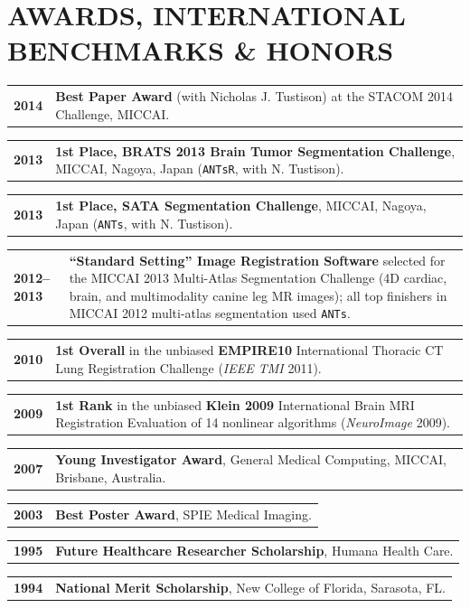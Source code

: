 \documentclass[10pt,letterpaper]{article}
\makeatletter
\newcommand{\cvline}[2]{%
  \noindent\begin{tabularx}{\textwidth}{@{} >{\raggedright\arraybackslash\bfseries\footnotesize\color{accent}}p{1.15in} >{\footnotesize\arraybackslash}X @{}}
    #1 & #2
  \end{tabularx}\par\vspace{2pt}%
}
\makeatother
\begin{document}
\section{AWARDS, INTERNATIONAL BENCHMARKS \& HONORS}
\cvline{2014}{\textbf{Best Paper Award} (with Nicholas J. Tustison) at the STACOM 2014 Challenge, MICCAI.}
\cvline{2013}{\textbf{1st Place, BRATS 2013 Brain Tumor Segmentation Challenge}, MICCAI, Nagoya, Japan (\texttt{ANTsR}, with N. Tustison).}
\cvline{2013}{\textbf{1st Place, SATA Segmentation Challenge}, MICCAI, Nagoya, Japan (\texttt{ANTs}, with N. Tustison).}
\cvline{2012--2013}{\textbf{``Standard Setting'' Image Registration Software} selected for the MICCAI 2013 Multi-Atlas Segmentation Challenge (4D cardiac, brain, and multimodality canine leg MR images); all top finishers in MICCAI 2012 multi-atlas segmentation used \texttt{ANTs}.}
\cvline{2010}{\textbf{1st Overall} in the unbiased \textbf{EMPIRE10} International Thoracic CT Lung Registration Challenge (\textit{IEEE TMI} 2011).}
\cvline{2009}{\textbf{1st Rank} in the unbiased \textbf{Klein 2009} International Brain MRI Registration Evaluation of 14 nonlinear algorithms (\textit{NeuroImage} 2009).}
\cvline{2007}{\textbf{Young Investigator Award}, General Medical Computing, MICCAI, Brisbane, Australia.}
\cvline{2003}{\textbf{Best Poster Award}, SPIE Medical Imaging.}
\cvline{1995}{\textbf{Future Healthcare Researcher Scholarship}, Humana Health Care.}
\cvline{1994}{\textbf{National Merit Scholarship}, New College of Florida, Sarasota, FL.}

\end{document}
